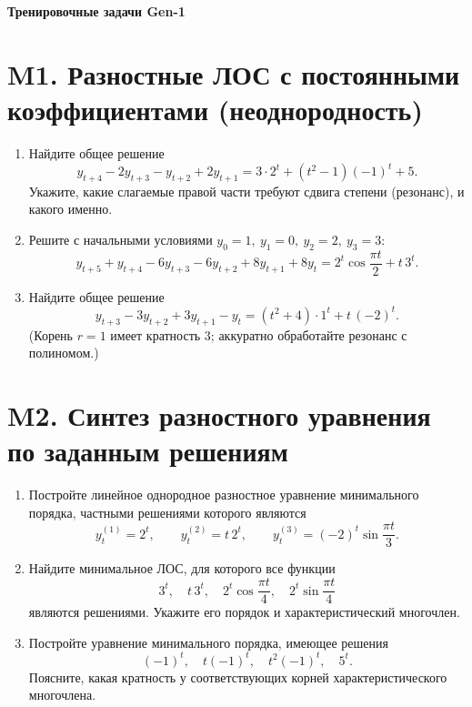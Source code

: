 \documentclass[12pt]{article}
\begin{document}
\begin{center}
\Large\textbf{Тренировочные задачи Gen-1}\\[2mm]
\end{center}

\tableofcontents
\newpage

\section{M1. Разностные ЛОС с постоянными коэффициентами (неоднородность)}
\begin{enumerate}
\item Найдите общее решение
\[
y_{t+4}-2y_{t+3}-y_{t+2}+2y_{t+1}=3\cdot 2^{t}+(t^2-1)(-1)^t+5.
\]
Укажите, какие слагаемые правой части требуют сдвига степени (резонанс), и какого именно.

\item Решите с начальными условиями $y_0=1,\ y_1=0,\ y_2=2,\ y_3=3$:
\[
y_{t+5}+y_{t+4}-6y_{t+3}-6y_{t+2}+8y_{t+1}+8y_t
=2^{t}\cos\frac{\pi t}{2}+t\,3^{t}.
\]

\item Найдите общее решение
\[
y_{t+3}-3y_{t+2}+3y_{t+1}-y_t
= (t^2+4)\cdot 1^t + t\,(-2)^t.
\]
(Корень $r=1$ имеет кратность $3$; аккуратно обработайте резонанс с полиномом.)
\end{enumerate}

\section{M2. Синтез разностного уравнения по заданным решениям}
\begin{enumerate}
\item Постройте линейное однородное разностное уравнение минимального порядка, частными решениями которого являются
\[
y_t^{(1)}=2^t,\qquad
y_t^{(2)}=t\,2^t,\qquad
y_t^{(3)}=(-2)^t\sin\!\frac{\pi t}{3}.
\]

\item Найдите минимальное ЛОС, для которого все функции
\[
3^t,\quad t\,3^t,\quad 2^t\cos\!\frac{\pi t}{4},\quad 2^t\sin\!\frac{\pi t}{4}
\]
являются решениями. Укажите его порядок и характеристический многочлен.

\item Постройте уравнение минимального порядка, имеющее решения
\[
(-1)^t,\quad t(-1)^t,\quad t^2(-1)^t,\quad 5^t.
\]
Поясните, какая кратность у соответствующих корней характеристического многочлена.
\end{enumerate}
\end{document}
